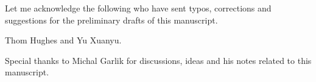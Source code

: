 %
%





Let me acknowledge the following who have sent typos, corrections and suggestions for  the preliminary drafts of this manuscript.

Thom Hughes and Yu Xuanyu.

Special thanks to Michal Garlik for discussions, ideas and his notes related to this manuscript. 

